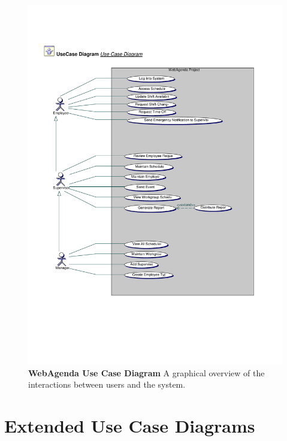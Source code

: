 \documentclass[letterpaper,12pt]{report}
\begin{document}
\begin{figure}[htp]
 \includegraphics[scale=0.8, trim=0mm 30mm 0mm 30mm]{externals/UseCaseDiagram.pdf}
 \caption{\small
\textbf{WebAgenda Use Case Diagram }\newline A graphical overview of the interactions between users and the system.}\label{fig:usecase}

\end{figure}


\chapter{Extended Use Case Diagrams}
\newcommand{\xuchead}{
		\begin{tabular}{| p{8.5cm} | p{8.5cm} |}
		\hline 
			\cellcolor[gray]{0.8}\textbf{Actor}\index{actor} &\cellcolor[gray]{0.8} \textbf{System}\index{system} \\ 
		\hline
		\end{tabular}
		\newline
		\newline
}
\end{document}
